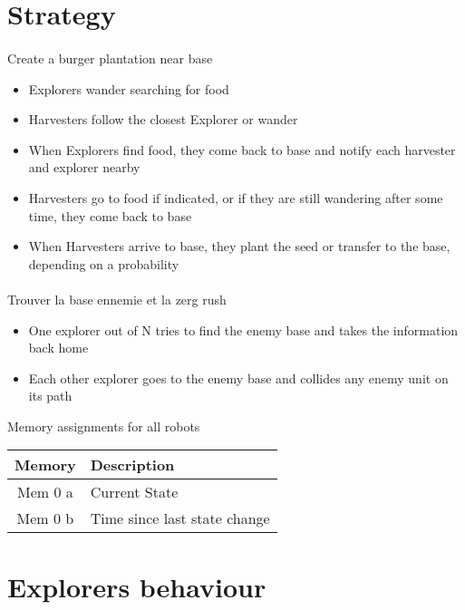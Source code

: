 \documentclass{article}
\begin{document}
\section{Strategy}

\paragraph{}
Create a burger plantation near base
\begin{itemize}
	\item Explorers wander searching for food
	\item Harvesters follow the closest Explorer or wander
	\item When Explorers find food, they come back to base and notify each harvester and explorer nearby
	\item Harvesters go to food if indicated, or if they are still wandering after some time, they come back to base
	\item When Harvesters arrive to base, they plant the seed or transfer to the base, depending on a probability
\end{itemize}

\paragraph{}
Trouver la base ennemie et la zerg rush
\begin{itemize}
	\item One explorer out of N tries to find the enemy base and takes the information back home
	\item Each other explorer goes to the enemy base and collides any enemy unit on its path
\end{itemize}

\begin{table}[ht]
	Memory assignments for all robots\\
	\begin{tabular}{|c|l|}
		\hline
		Memory & Description\\
		\hline
		Mem 0 a & Current State\\
		Mem 0 b & Time since last state change\\
		\hline
	\end{tabular}
\end{table}

\section{Explorers behaviour}
\end{document}
